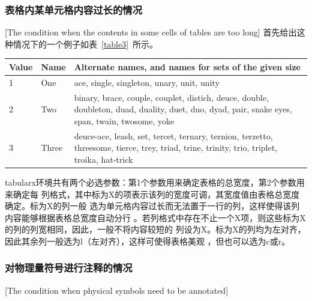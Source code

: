 \subsubsection{表格内某单元格内容过长的情况}[The condition when the contents in
some cells of tables are too long]
首先给出这种情况下的一个例子如表~\ref{table3}~所示。
\begin{table}[htbp]
  \centering
{}\vspace{0.5em}\wuhao
\begin{tabularx}{0.7\textwidth}{llX}
\toprule
Value & Name & Alternate names, and names for sets of the given size\\
\midrule
1 & One & ace, single, singleton, unary, unit, unity\\
2 & Two & binary, brace, couple, couplet, distich, deuce, double, doubleton, duad, duality, duet, duo, dyad, pair, snake eyes, span, twain, twosome, yoke\\
3 & Three & deuce-ace, leash, set, tercet, ternary, ternion, terzetto, threesome, tierce, trey, triad, trine, trinity, trio, triplet, troika, hat-trick\\
\bottomrule
\end{tabularx}
\end{table}
tabularx环境共有两个必选参数：第1个参数用来确定表格的总宽度，第2个参数用来确定每
列格式，其中标为X的项表示该列的宽度可调，其宽度值由表格总宽度确定。标为X的列一般
选为单元格内容过长而无法置于一行的列，这样使得该列内容能够根据表格总宽度自动分行
。若列格式中存在不止一个X项，则这些标为X的列的列宽相同，因此，一般不将内容较短的
列设为X。标为X的列均为左对齐，因此其余列一般选为l（左对齐），这样可使得表格美观
，但也可以选为c或r。

\subsubsection{对物理量符号进行注释的情况}[The condition when physical symbols
need to be annotated]

